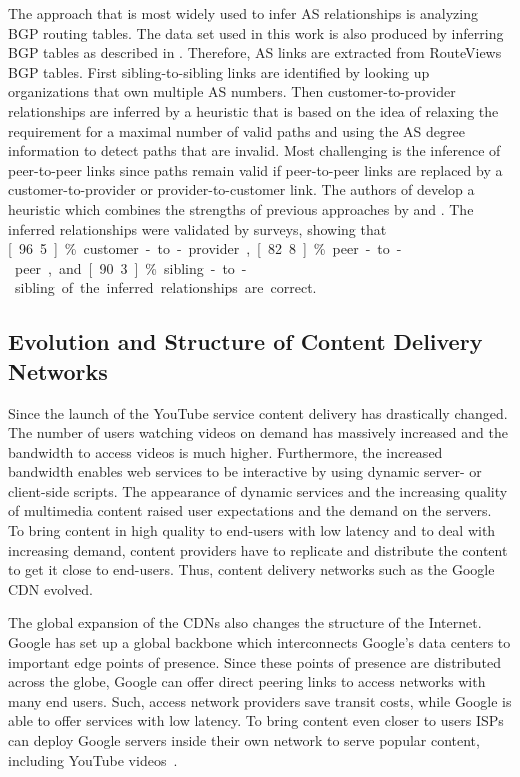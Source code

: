The approach that is most widely used to infer AS relationships is analyzing BGP routing tables. The data set used in this work is also produced by inferring BGP tables as described in \cite{dimitropoulos2007relationships}. Therefore, AS links are extracted from RouteViews BGP tables. First sibling-to-sibling links are identified by looking up organizations that own multiple AS numbers. Then customer-to-provider relationships are inferred by a heuristic that is based on the idea of relaxing the requirement for a maximal number of valid paths and using the AS degree information to detect paths that are invalid. Most challenging is the inference of peer-to-peer links since paths remain valid if peer-to-peer links are replaced by a customer-to-provider or provider-to-customer link. The authors of \cite{dimitropoulos2007relationships} develop a heuristic which combines the strengths of previous approaches by \cite{gao2001} and \cite{di2003computing}. The inferred relationships were validated by surveys, showing that \unit[96.5]{\%} customer-to-provider, \unit[82.8]{\%} peer-to-peer, and \unit[90.3]{\%} sibling-to-sibling of the inferred relationships are correct.

\subsection{Evolution and Structure of Content Delivery Networks}
Since the launch of the YouTube service content delivery has drastically changed.
The number of users watching videos on demand has massively increased and the bandwidth to access videos is much higher.
Furthermore, the increased bandwidth enables web services to be interactive by using dynamic server- or client-side scripts.
The appearance of dynamic services and the increasing quality of multimedia content raised user expectations and the demand on the servers.
To bring content in high quality to end-users with low latency and to deal with increasing demand, content providers have to replicate and distribute the content to get it close to end-users.
Thus, content delivery networks such as the Google CDN evolved.

The global expansion of the CDNs also changes the structure of the Internet.
Google has set up a global backbone which interconnects Google's data centers to important edge points of presence.
Since these points of presence are distributed across the globe, Google can offer direct peering links to access networks with many end users.
Such, access network providers save transit costs, while Google is able to offer services with low latency.
To bring content even closer to users ISPs can deploy Google servers inside their own network to serve popular content, including YouTube videos~\cite{gcc}.

